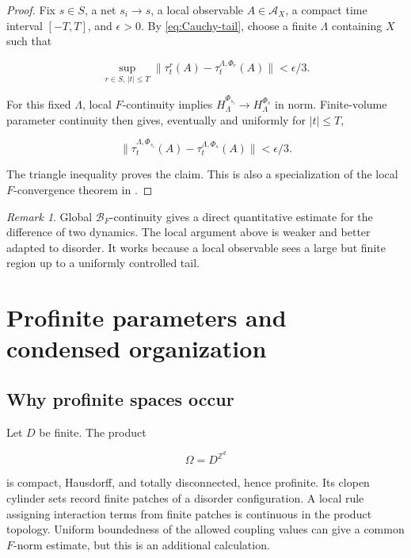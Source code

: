 \documentclass[12pt]{article}
\theoremstyle{definition}
\theoremstyle{remark}
\newtheorem{remark}[theorem]{Remark}
\newcommand{\Alg}{\mathcal A}
\begin{document}
\begin{proof}
Fix $s\in S$, a net $s_i\to s$, a local observable $A\in\Alg_X$, a compact
time interval $[-T,T]$, and $\epsilon>0$.  By
\cref{eq:Cauchy-tail}, choose a finite $\Lambda$ containing $X$ such that

\begin{equation}
  \sup_{r\in S,\,|t|\le T}
  \|\tau_t^r(A)-\tau_t^{\Lambda,\Phi_r}(A)\|
  <\epsilon/3.
\end{equation}

For this fixed $\Lambda$, local $F$-continuity implies
$H_\Lambda^{\Phi_{s_i}}\to H_\Lambda^{\Phi_s}$ in norm.  Finite-volume
parameter continuity then gives, eventually and uniformly for $|t|\le T$,

\begin{equation}
  \|\tau_t^{\Lambda,\Phi_{s_i}}(A)
       -\tau_t^{\Lambda,\Phi_s}(A)\|<\epsilon/3.
\end{equation}

The triangle inequality proves the claim.  This is also a specialization of
the local $F$-convergence theorem in \cite{NSY2019}.
\end{proof}

\begin{remark}
Global $\mathcal B_F$-continuity gives a direct quantitative estimate for the
difference of two dynamics.  The local argument above is weaker and better
adapted to disorder.  It works because a local observable sees a large but
finite region up to a uniformly controlled tail.
\end{remark}

\section{Profinite parameters and condensed organization}

\subsection{Why profinite spaces occur}

Let $D$ be finite.  The product

\begin{equation}
  \Omega=D^{\mathbb Z^d}
\end{equation}

is compact, Hausdorff, and totally disconnected, hence profinite.  Its clopen
cylinder sets record finite patches of a disorder configuration.  A local
rule assigning interaction terms from finite patches is continuous in the
product topology.  Uniform boundedness of the allowed coupling values can
give a common $F$-norm estimate, but this is an additional calculation.
\end{document}
